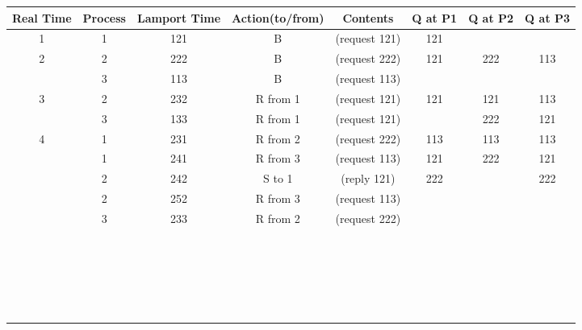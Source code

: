 \documentclass{article}
\begin{document}
\begin{enumerate}
\begin{changemargin}{-0.5in}{0.5in} 
\begin{tabular}{|c|c|c|c|c|c|c|c|}
\hline
Real Time & Process & Lamport Time & Action(to/from) & Contents & Q at P1 & Q at P2 & Q at P3 \\
\hline
1 & 1 & 121 & B & (request 121) & 121 &  &  \\
\hline
2 & 2 & 222 & B & (request 222) & 121 & 222 & 113 \\
  & 3 & 113 & B & (request 113) & & & \\
\hline
3 & 2& 232& R from 1& (request 121)& 121 & 121 & 113 \\
  & 3& 133& R from 1& (request 121)&     & 222 & 121 \\
\hline
4 & 1 & 231 & R from 2 & (request 222) & 113 & 113 & 113 \\
  & 1 & 241 & R from 3 & (request 113) & 121 & 222 & 121 \\
  & 2 & 242 & S to 1   & (reply 121)   & 222 &     & 222 \\
  & 2 & 252 & R from 3 & (request 113) &     &     &     \\
  & 3 & 233 & R from 2 & (request 222) &     &     &     \\
\hline
  & & & & & & & \\
  & & & & & & & \\
  & & & & & & & \\
\hline
  & & & & & & & \\
  & & & & & & & \\
  & & & & & & & \\
\hline
  & & & & & & & \\
  & & & & & & & \\
  & & & & & & & \\
\hline
  & & & & & & & \\
  & & & & & & & \\
  & & & & & & & \\
\hline
  & & & & & & & \\
  & & & & & & & \\
  & & & & & & & \\
\hline
  & & & & & & & \\
  & & & & & & & \\
  & & & & & & & \\
\hline
  & & & & & & & \\
  & & & & & & & \\
  & & & & & & & \\
\hline
  & & & & & & & \\

\end{tabular}
\end{changemargin}
\end{enumerate}
\end{document}
